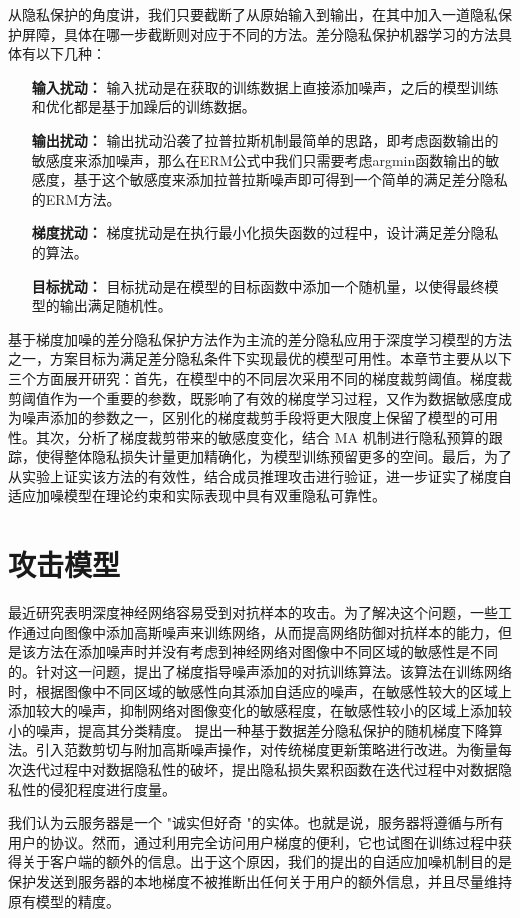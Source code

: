 从隐私保护的角度讲，我们只要截断了从原始输入到输出，在其中加入一道隐私保护屏障，具体在哪一步截断则对应于不同的方法。差分隐私保护机器学习的方法具体有以下几种：
\begin{itemize}
	\item [\textbf{输入扰动：}] 输入扰动是在获取的训练数据上直接添加噪声，之后的模型训练和优化都是基于加躁后的训练数据。
	\item [\textbf{输出扰动：}] 输出扰动沿袭了拉普拉斯机制最简单的思路，即考虑函数输出的敏感度来添加噪声，那么在ERM公式中我们只需要考虑argmin函数输出的敏感度，基于这个敏感度来添加拉普拉斯噪声即可得到一个简单的满足差分隐私的ERM方法。
	\item [\textbf{梯度扰动：}] 梯度扰动是在执行最小化损失函数的过程中，设计满足差分隐私的算法。
	\item [\textbf{目标扰动：}] 目标扰动是在模型的目标函数中添加一个随机量，以使得最终模型的输出满足随机性。
\end{itemize}

基于梯度加噪的差分隐私保护方法作为主流的差分隐私应用于深度学习模型的方法之一，方案目标为满足差分隐私条件下实现最优的模型可用性。本章节主要从以下三个方面展开研究：首先，在模型中的不同层次采用不同的梯度裁剪阈值。梯度裁剪阈值作为一个重要的参数，既影响了有效的梯度学习过程，又作为数据敏感度成为噪声添加的参数之一，区别化的梯度裁剪手段将更大限度上保留了模型的可用性。其次，分析了梯度裁剪带来的敏感度变化，结合 MA 机制进行隐私预算的跟踪，使得整体隐私损失计量更加精确化，为模型训练预留更多的空间。最后，为了从实验上证实该方法的有效性，结合成员推理攻击进行验证，进一步证实了梯度自适应加噪模型在理论约束和实际表现中具有双重隐私可靠性。 


\section{攻击模型}
最近研究表明深度神经网络容易受到对抗样本的攻击。为了解决这个问题，一些工作通过向图像中添加高斯噪声来训练网络，从而提高网络防御对抗样本的能力，但是该方法在添加噪声时并没有考虑到神经网络对图像中不同区域的敏感性是不同的。针对这一问题，提出了梯度指导噪声添加的对抗训练算法。该算法在训练网络时，根据图像中不同区域的敏感性向其添加自适应的噪声，在敏感性较大的区域上添加较大的噪声，抑制网络对图像变化的敏感程度，在敏感性较小的区域上添加较小的噪声，提高其分类精度。
提出一种基于数据差分隐私保护的随机梯度下降算法。引入范数剪切与附加高斯噪声操作，对传统梯度更新策略进行改进。为衡量每次迭代过程中对数据隐私性的破坏，提出隐私损失累积函数在迭代过程中对数据隐私性的侵犯程度进行度量。

我们认为云服务器是一个 "诚实但好奇 "的实体。也就是说，服务器将遵循与所有用户的协议。然而，通过利用完全访问用户梯度的便利，它也试图在训练过程中获得关于客户端的额外的信息。出于这个原因，我们的提出的自适应加噪机制目的是保护发送到服务器的本地梯度不被推断出任何关于用户的额外信息，并且尽量维持原有模型的精度。


